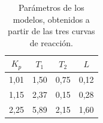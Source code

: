 \begin{table}
\caption[Parámetros de los modelos]{Parámetros de los modelos, obtenidos a partir de las tres curvas de reacción.} \label{tab:01}
    \begin{tabular}{@{}*{4}{c}@{}}
    \toprule
    $K_p$ & $T_1$ & $T_2$ & $L$ \\
    \midrule
     1,01 & 1,50 & 0,75 & 0,12 \\
		 1,15 & 2,37 & 0,15 & 0,28 \\
		 2,25 & 5,89 & 2,15 & 1,60 \\
    \bottomrule
    \end{tabular}
\end{table}
